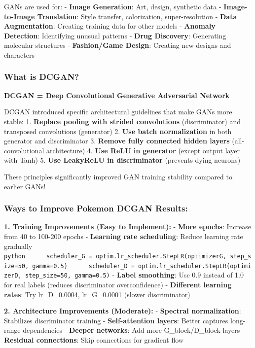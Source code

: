 \documentclass[11pt]{article}
\begin{document}
GANs are used for: - \textbf{Image Generation}: Art, design, synthetic
data - \textbf{Image-to-Image Translation}: Style transfer,
colorization, super-resolution - \textbf{Data Augmentation}: Creating
training data for other models - \textbf{Anomaly Detection}: Identifying
unusual patterns - \textbf{Drug Discovery}: Generating molecular
structures - \textbf{Fashion/Game Design}: Creating new designs and
characters

\subsubsection{What is DCGAN?}\label{what-is-dcgan}

\textbf{DCGAN = Deep Convolutional Generative Adversarial Network}

DCGAN introduced specific architectural guidelines that make GANs more
stable: 1. \textbf{Replace pooling with strided convolutions}
(discriminator) and transposed convolutions (generator) 2. \textbf{Use
batch normalization} in both generator and discriminator 3.
\textbf{Remove fully connected hidden layers} (all-convolutional
architecture) 4. \textbf{Use ReLU in generator} (except output layer
with Tanh) 5. \textbf{Use LeakyReLU in discriminator} (prevents dying
neurons)

These principles significantly improved GAN training stability compared
to earlier GANs!

\subsubsection{Ways to Improve Pokemon DCGAN
Results:}\label{ways-to-improve-pokemon-dcgan-results}

\textbf{1. Training Improvements (Easy to Implement):} - \textbf{More
epochs}: Increase from 40 to 100-200 epochs - \textbf{Learning rate
scheduling}: Reduce learning rate gradually
\texttt{python\ \ \ \ \ \ scheduler\_G\ =\ optim.lr\_scheduler.StepLR(optimizerG,\ step\_size=50,\ gamma=0.5)\ \ \ \ \ \ scheduler\_D\ =\ optim.lr\_scheduler.StepLR(optimizerD,\ step\_size=50,\ gamma=0.5)}
- \textbf{Label smoothing}: Use 0.9 instead of 1.0 for real labels
(reduces discriminator overconfidence) - \textbf{Different learning
rates}: Try lr\_D=0.0004, lr\_G=0.0001 (slower discriminator)

\textbf{2. Architecture Improvements (Moderate):} - \textbf{Spectral
normalization}: Stabilizes discriminator training -
\textbf{Self-attention layers}: Better captures long-range dependencies
- \textbf{Deeper networks}: Add more G\_block/D\_block layers -
\textbf{Residual connections}: Skip connections for gradient flow
\end{document}
